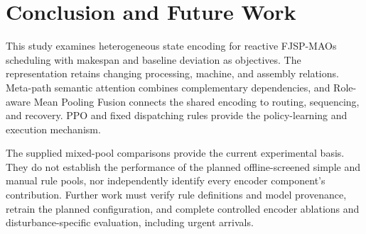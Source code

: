 \section{Conclusion and Future Work}
\label{sec:conclusion}


%
%

This study examines heterogeneous state encoding for reactive FJSP-MAOs scheduling with makespan
and baseline deviation as objectives. The representation retains changing processing, machine, and
assembly relations. Meta-path semantic attention combines complementary dependencies, and
Role-aware Mean Pooling Fusion connects the shared encoding to routing, sequencing, and recovery.
PPO and fixed dispatching rules provide the policy-learning and execution mechanism.

The supplied mixed-pool comparisons provide the current experimental basis. They do not establish the performance of the planned offline-screened simple and manual rule
pools, nor independently identify every encoder component's contribution. Further work must verify
rule definitions and model provenance, retrain the planned configuration, and complete controlled
encoder ablations and disturbance-specific evaluation, including urgent arrivals.
